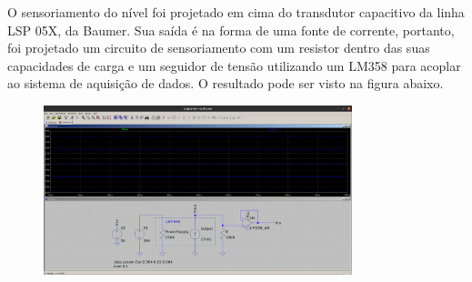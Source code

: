 \documentclass[a4paper]{report}
\begin{document}
O sensoriamento do nível foi projetado em cima do transdutor capacitivo da linha LSP 05X, da Baumer. Sua saída é na forma de uma fonte de corrente, portanto, foi projetado um circuito de sensoriamento com um resistor dentro das suas capacidades de carga e um seguidor de tensão utilizando um LM358 para acoplar ao sistema de aquisição de dados. O resultado pode ser visto na figura abaixo.

\begin{figure}[H]
    \centering
    \includegraphics[width=0.8\textwidth]{figures/sym_level.png}
\end{figure}
\end{document}
